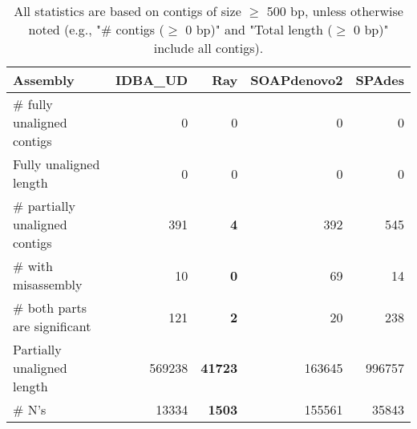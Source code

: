 \documentclass[12pt,a4paper]{article}
\begin{document}
\begin{table}[ht]
\begin{center}
\caption{All statistics are based on contigs of size $\geq$ 500 bp, unless otherwise noted (e.g., "\# contigs ($\geq$ 0 bp)" and "Total length ($\geq$ 0 bp)" include all contigs).}
\begin{tabular}{|l*{4}{|r}|}
\hline
Assembly & IDBA\_UD & Ray & SOAPdenovo2 & SPAdes \\ \hline
\# fully unaligned contigs & 0 & 0 & 0 & 0 \\ \hline
Fully unaligned length & 0 & 0 & 0 & 0 \\ \hline
\# partially unaligned contigs & 391 & {\bf 4} & 392 & 545 \\ \hline
\hspace{5mm}\# with misassembly & 10 & {\bf 0} & 69 & 14 \\ \hline
\hspace{5mm}\# both parts are significant & 121 & {\bf 2} & 20 & 238 \\ \hline
Partially unaligned length & 569238 & {\bf 41723} & 163645 & 996757 \\ \hline
\# N's & 13334 & {\bf 1503} & 155561 & 35843 \\ \hline
\end{tabular}
\end{center}
\end{table}
\end{document}
